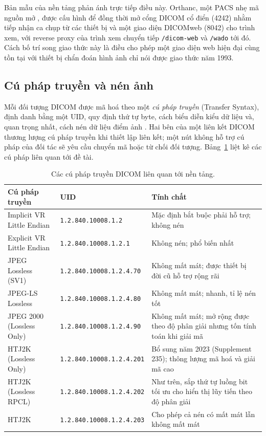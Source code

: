 Bản mẫu của nền tảng phản ánh trực tiếp điều này. Orthanc, một PACS nhẹ mã nguồn
mở \cite{jodogne2018orthanc}, được cấu hình để đồng thời mở cổng DICOM cổ điển (4242) nhằm tiếp nhận ca
chụp từ các thiết bị và một giao diện DICOMweb (8042) cho trình xem, với reverse
proxy của trình xem chuyển tiếp \texttt{/dicom-web} và \texttt{/wado} tới đó.
Cách bố trí song giao thức này là điều cho phép một giao diện web hiện đại cùng
tồn tại với thiết bị chẩn đoán hình ảnh chỉ nói được giao thức năm 1993.

\subsection{Cú pháp truyền và nén ảnh}
\label{sec:transfersyntax}

Mỗi đối tượng DICOM được mã hoá theo một \emph{cú pháp truyền} (Transfer Syntax),
định danh bằng một UID, quy định thứ tự byte, cách biểu diễn kiểu dữ liệu và,
quan trọng nhất, cách nén dữ liệu điểm ảnh \cite{dicomps35}. Hai bên của một liên
kết DICOM thương lượng cú pháp truyền khi thiết lập liên kết; một nút không hỗ trợ
cú pháp của đối tác sẽ yêu cầu chuyển mã hoặc từ chối đối tượng. Bảng~\ref{tab:ts}
liệt kê các cú pháp liên quan tới đề tài.

\begin{table}[H]
\centering
\small
\begin{tabularx}{\textwidth}{@{}l l X@{}}
\toprule
\textbf{Cú pháp truyền} & \textbf{UID} & \textbf{Tính chất} \\
\midrule
Implicit VR Little Endian & \texttt{1.2.840.10008.1.2} & Mặc định bắt buộc phải hỗ trợ; không nén \\
Explicit VR Little Endian & \texttt{1.2.840.10008.1.2.1} & Không nén; phổ biến nhất \\
JPEG Lossless (SV1) & \texttt{1.2.840.10008.1.2.4.70} & Không mất mát; được thiết bị đời cũ hỗ trợ rộng rãi \\
JPEG-LS Lossless & \texttt{1.2.840.10008.1.2.4.80} & Không mất mát; nhanh, tỉ lệ nén tốt \\
JPEG 2000 (Lossless Only) & \texttt{1.2.840.10008.1.2.4.90} & Không mất mát; mở rộng được theo độ phân giải nhưng tốn tính toán khi giải mã \\
HTJ2K (Lossless Only) & \texttt{1.2.840.10008.1.2.4.201} & Bổ sung năm 2023 (Supplement 235); thông lượng mã hoá và giải mã cao \\
HTJ2K (Lossless RPCL) & \texttt{1.2.840.10008.1.2.4.202} & Như trên, sắp thứ tự luồng bit tối ưu cho hiển thị lũy tiến theo độ phân giải \\
HTJ2K & \texttt{1.2.840.10008.1.2.4.203} & Cho phép cả nén có mất mát lẫn không mất mát \\
\bottomrule
\end{tabularx}
\caption{Các cú pháp truyền DICOM liên quan tới nền tảng.}
\label{tab:ts}
\end{table}

